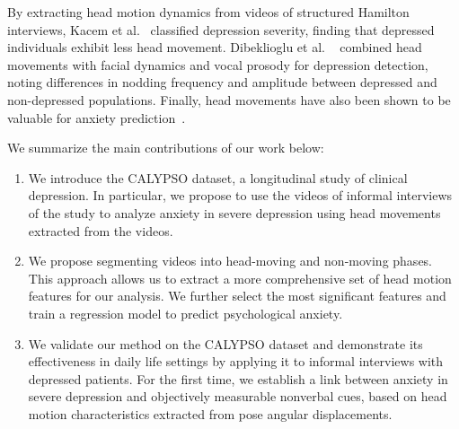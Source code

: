 By extracting head motion dynamics from videos of structured Hamilton interviews, Kacem et al.~\cite{KacemIEEEFG2018} classified depression severity, finding that depressed individuals exhibit less head movement. Dibeklioglu et al. ~\cite{DibekliogluICMI2015} combined head movements with facial dynamics and vocal prosody for depression detection, noting differences in nodding frequency and amplitude between depressed and non-depressed populations. Finally, head movements have also been shown to be valuable for anxiety prediction~\cite{won2016identifying}. 
\\
\par We summarize the main contributions of our work below:
\begin{enumerate}
\item We introduce the CALYPSO dataset, a longitudinal study of clinical depression. In particular, we propose to use the videos of informal interviews of the study to analyze anxiety in severe depression using head movements extracted from the videos. %
\item We propose segmenting videos into head-moving and non-moving phases. This approach allows us to extract a more comprehensive set of head motion features for our analysis. We further select the most significant features and train a regression model to predict psychological anxiety.
\item We validate our method on the CALYPSO dataset and demonstrate its effectiveness in daily life settings by applying it to informal interviews with depressed patients. For the first time, we establish a link between anxiety in severe depression and objectively measurable nonverbal cues, based on head motion characteristics extracted from pose angular displacements.

\end{enumerate}
